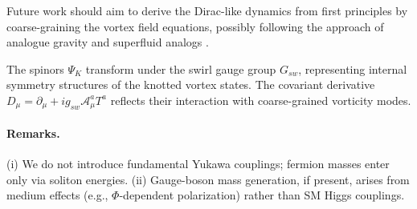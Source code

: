 \documentclass[12pt]{article}
\begin{document}
    Future work should aim to derive the Dirac-like dynamics from first principles by coarse-graining the vortex field equations, possibly following the approach of analogue gravity and superfluid analogs \cite{Barcelo2005,Volovik2009,CarterLanglois1995}.

    The spinors $\Psi_K$ transform under the swirl gauge group $G_{sw}$, representing internal symmetry structures of the knotted vortex states. The covariant derivative $D_\mu = \partial_\mu + i g_{sw} \mathcal{A}_\mu^a T^a$ reflects their interaction with coarse-grained vorticity modes.

    \paragraph{Remarks.} (i) We do not introduce fundamental Yukawa couplings; fermion masses enter only via soliton energies. (ii) Gauge-boson mass generation, if present, arises from medium effects (e.g., $\Phi$-dependent polarization) rather than SM Higgs couplings.
\end{document}
